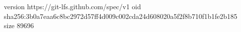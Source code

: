 version https://git-lfs.github.com/spec/v1
oid sha256:3b0a7eaa6c8bc2972d57ff4d009c002cda24d608020a5f2f8b710f1b1fe2b185
size 89696
